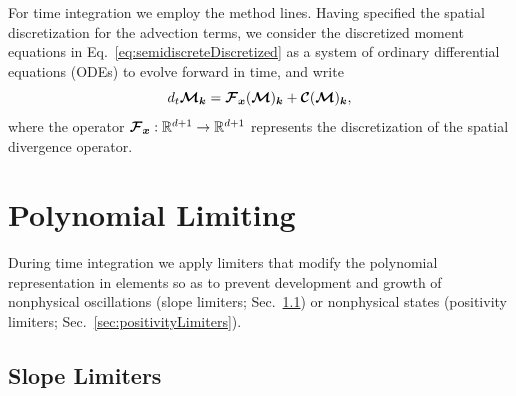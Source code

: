 \documentclass[10pt,preprint]{aastex}
\begin{document}
For time integration we employ the method lines.  
Having specified the spatial discretization for the advection terms, we consider the discretized moment equations in Eq.~\eqref{eq:semidiscreteDiscretized} as a system of ordinary differential equations (ODEs) to evolve forward in time, and write
\begin{equation}
  d_{t}\boldsymbol{\mathcal{M}}_{\boldsymbol{k}}
  =\boldsymbol{\mathcal{F}}_{\boldsymbol{x}}(\boldsymbol{\mathcal{M}})_{\boldsymbol{k}}+\boldsymbol{\mathcal{C}}(\boldsymbol{\mathcal{M}})_{\boldsymbol{k}},
  \label{eq:momentEquationsODEs}
\end{equation}
where the operator $\boldsymbol{\mathcal{F}}_{\boldsymbol{x}}:\mathbb{R}^{d+1}\to\mathbb{R}^{d+1}$ represents the discretization of the spatial divergence operator.  

\clearpage

\section{Polynomial Limiting}

During time integration we apply limiters that modify the polynomial representation in elements so as to prevent development and growth of nonphysical oscillations (slope limiters; Sec.~\ref{sec:slopeLimiters}) or nonphysical states (positivity limiters; Sec.~\ref{sec:positivityLimiters}).  

\subsection{Slope Limiters}
\label{sec:slopeLimiters}
\end{document}
